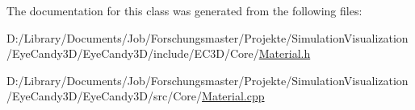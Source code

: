 The documentation for this class was generated from the following files\+:\begin{DoxyCompactItemize}
\item 
D\+:/\+Library/\+Documents/\+Job/\+Forschungsmaster/\+Projekte/\+Simulation\+Visualization/\+Eye\+Candy3\+D/\+Eye\+Candy3\+D/include/\+E\+C3\+D/\+Core/\mbox{\hyperlink{_material_8h}{Material.\+h}}\item 
D\+:/\+Library/\+Documents/\+Job/\+Forschungsmaster/\+Projekte/\+Simulation\+Visualization/\+Eye\+Candy3\+D/\+Eye\+Candy3\+D/src/\+Core/\mbox{\hyperlink{_material_8cpp}{Material.\+cpp}}\end{DoxyCompactItemize}
